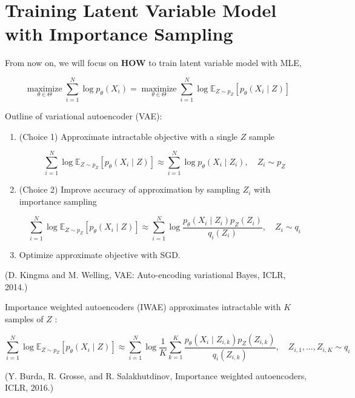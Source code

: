 \section{Training Latent Variable Model with Importance Sampling}

From now on, we will focus on \textbf{HOW} to train latent variable model with MLE,

$$
\underset{\theta \in \Theta}{\operatorname{maximize}} \sum_{i=1}^{N} \log p_{\theta}\left(X_{i}\right)=\underset{\theta \in \Theta}{\operatorname{maximize}} \sum_{i=1}^{N} \log \mathbb{E}_{Z \sim p_{Z}}\left[p_{\theta}\left(X_{i} \mid Z\right)\right]
$$

\begin{concept}
    Outline of variational autoencoder (VAE):

    \begin{enumerate}
        \item
        (Choice 1) Approximate intractable objective with a single $Z$ sample

        $$
        \sum_{i=1}^{N} \log \mathbb{E}_{Z \sim p_{Z}}\left[p_{\theta}\left(X_{i} \mid Z\right)\right] \approx \sum_{i=1}^{N} \log p_{\theta}\left(X_{i} \mid Z_{i}\right), \quad Z_{i} \sim p_{Z}
        $$
        \item
        (Choice 2) Improve accuracy of approximation by sampling $Z_{i}$ with importance sampling

        $$
        \sum_{i=1}^{N} \log \mathbb{E}_{Z \sim p_{Z}}\left[p_{\theta}\left(X_{i} \mid Z\right)\right] \approx \sum_{i=1}^{N} \log \frac{p_{\theta}\left(X_{i} \mid Z_{i}\right) p_{Z}\left(Z_{i}\right)}{q_{i}\left(Z_{i}\right)}, \quad Z_{i} \sim q_{i}
        $$
        \item Optimize approximate objective with SGD.
    \end{enumerate}

    (D. Kingma and M. Welling, VAE: Auto-encoding variational Bayes, ICLR, 2014.)
\end{concept}

\begin{concept}
    Importance weighted autoencoders (IWAE) approximates intractable with $K$ samples of $Z$ :

    $$
    \sum_{i=1}^{N} \log \mathbb{E}_{Z \sim p_{Z}}\left[p_{\theta}\left(X_{i} \mid Z\right)\right] \approx \sum_{i=1}^{N} \log \frac{1}{K} \sum_{k=1}^{K} \frac{p_{\theta}\left(X_{i} \mid Z_{i, k}\right) p_{Z}\left(Z_{i, k}\right)}{q_{i}\left(Z_{i, k}\right)}, \quad Z_{i, 1}, \ldots, Z_{i, K} \sim q_{i}
    $$

    (Y. Burda, R. Grosse, and R. Salakhutdinov, Importance weighted autoencoders, ICLR, 2016.)
\end{concept}


